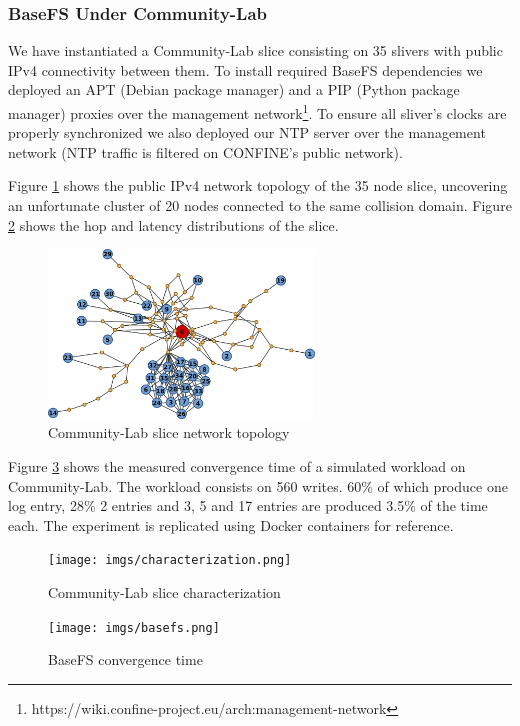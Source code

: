 \documentclass{sig-alternate}
\begin{document}
\subsubsection{BaseFS Under Community-Lab}

We have instantiated a Community-Lab slice consisting on 35 slivers with public IPv4 connectivity between them. To install required BaseFS dependencies we deployed an APT (Debian package manager) and a PIP (Python package manager) proxies over the management network\footnote{https://wiki.confine-project.eu/arch:management-network}. To ensure all sliver's clocks are properly synchronized we also deployed our NTP server over the management network (NTP traffic is filtered on CONFINE's public network).

Figure \ref{fig:topology} shows the public IPv4 network topology of the 35 node slice, uncovering an unfortunate cluster of 20 nodes connected to the same collision domain. Figure \ref{fig:characterization} shows the hop and latency distributions of the slice.


\begin{figure}
\centering
\includegraphics[width=200pt]{imgs/topology.png}
\caption{Community-Lab slice network topology}
\label{fig:topology}
\end{figure}

Figure \ref{fig:basefs} shows the measured convergence time of a simulated workload on Community-Lab. The workload consists on 560 writes. 60\% of which produce one log entry, 28\% 2 entries and 3, 5 and 17 entries are produced 3.5\% of the time each. The experiment is replicated using Docker containers for reference.


\begin{figure}
\centering
\texttt{[image: imgs/characterization.png]}
\caption{Community-Lab slice characterization}
\label{fig:characterization}
\end{figure}


\begin{figure}
\centering
\texttt{[image: imgs/basefs.png]}
\caption{BaseFS convergence time}
\label{fig:basefs}
\end{figure}
\end{document}
